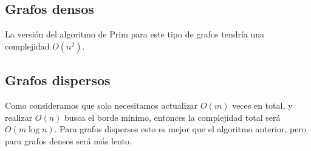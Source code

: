 \subsection{Grafos densos}

La versión del algoritmo de Prim para este tipo de grafos tendría una complejidad $O(n^2)$.

\subsection{Grafos dispersos}

Como consideramos que solo necesitamos actualizar $O(m)$ veces en total, y realizar $O(n)$ busca el borde mínimo, entonces la complejidad total será $O(m \log n)$. Para grafos dispersos esto es mejor que el algoritmo anterior, pero para grafos densos será más lento.